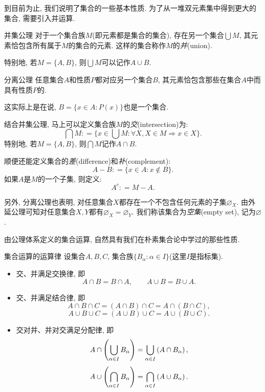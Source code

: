 到目前为止, 我们说明了集合的一些基本性质. 为了从一堆双元素集中得到更大的集合, 需要引入并运算. 

\begin{axiom}{并集公理}
	对于一个集合族$M$(即元素都是集合的集合), 存在另一个集合$\bigcup M$, 其元素恰包含所有属于$M$的集合的元素. 这样的集合称作$M$的\textit{并}(union). 
\end{axiom}

特别地, 若$M=\{ A, B \}$, 则$\bigcup M$可以记作$A \cup B$. 

\begin{axiom}{分离公理}
	任意集合$A$和性质$P$都对应另一个集合$B$, 其元素恰包含那些在集合$A$中而具有性质$P$的. 
\end{axiom}

这实际上是在说, $B=\{ x \in A :  P(x) \}$也是一个集合. 

结合并集公理, 马上可以定义集合族$M$的\textit{交}(intersection)为: $$\bigcap M : = \{ x \in \bigcup M :  \forall X, X \in M \Rightarrow x \in X \}.$$
特别地, 若$M= \{ A, B \}$, 则$\bigcap M$记作$A \cap B$. 

顺便还能定义集合的\textit{差}(difference)和\textit{补}(complement): $$A - B : = \{ x \in A :  x \notin B \}.$$
如果$A$是$M$的一个子集, 则定义: $$A^c : = M - A.$$

另外, 分离公理也表明, 对任意集合$X$都存在一个不包含任何元素的子集$\varnothing _X$. 由外延公理可知对任意集合$X, Y$都有$\varnothing _X = \varnothing _Y$. 我们称该集合为\textit{空集}(empty set), 记为$\varnothing$. 

由公理体系定义的集合运算, 自然具有我们在朴素集合论中学过的那些性质. 

\begin{proposition}{集合运算的运算律}
	设集合$A, B, C$, 集合族$\{ B_{\alpha} :  \alpha \in I \}$(这里$I$是指标集). 
	\begin{itemize}
		\item 交、并满足交换律, 即$$A \cap B = B \cap A,  \qquad A \cup B = B \cup A.$$
		\item 交、并满足结合律, 即
	$$A \cap B \cap C = (A \cap B) \cap C = A \cap (B \cap C), $$
	$$A \cup B \cup C = (A \cup B) \cup C = A \cup (B \cup C).$$
		\item 交对并、并对交满足分配律, 即
	$$A \cap \left( \bigcup_{\alpha \in I} B_\alpha \right) = \bigcup_{\alpha \in I} \left( A \cap B_{\alpha} \right), $$
	$$A \cup \left( \bigcap_{\alpha \in I} B_\alpha \right) = \bigcap_{\alpha \in I} \left( A \cup B_{\alpha} \right).$$
	\end{itemize}
\end{proposition}

